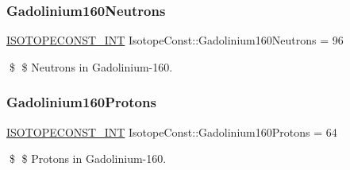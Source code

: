 \subsubsection{\texorpdfstring{Gadolinium160\+Neutrons}{Gadolinium160Neutrons}}
{\footnotesize\ttfamily \mbox{\hyperlink{group___isotope_const-_macros_ga5f18360b3e99483a35c32d789e62621c}{I\+S\+O\+T\+O\+P\+E\+C\+O\+N\+S\+T\+\_\+\+I\+NT}} Isotope\+Const\+::\+Gadolinium160\+Neutrons = 96}

\$ \$ Neutrons in Gadolinium-\/160. \mbox{\label{group___isotope_const-_gadolinium-_gd160_ga31e537d6d79708cefeb507b52496512a}} 
\subsubsection{\texorpdfstring{Gadolinium160\+Protons}{Gadolinium160Protons}}
{\footnotesize\ttfamily \mbox{\hyperlink{group___isotope_const-_macros_ga5f18360b3e99483a35c32d789e62621c}{I\+S\+O\+T\+O\+P\+E\+C\+O\+N\+S\+T\+\_\+\+I\+NT}} Isotope\+Const\+::\+Gadolinium160\+Protons = 64}

\$ \$ Protons in Gadolinium-\/160. 